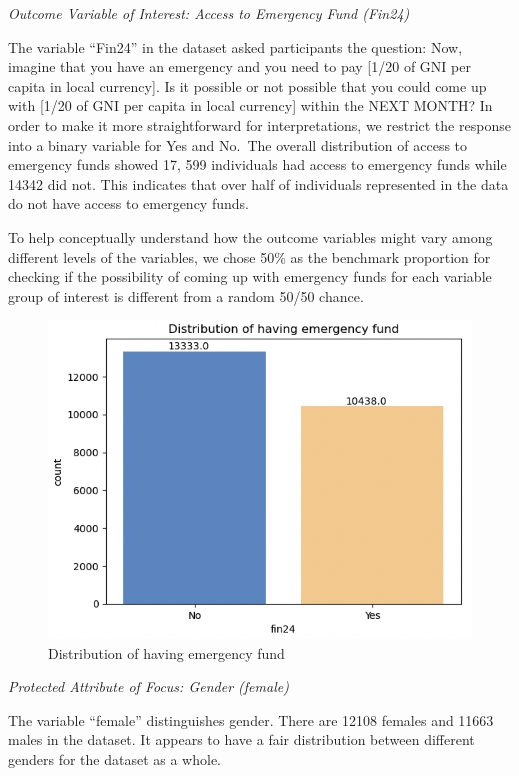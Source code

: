 \documentclass[12pt]{article}
\begin{document}
\emph{Outcome Variable of Interest: Access to Emergency Fund (Fin24)}

The variable ``Fin24'' in the dataset asked participants the question:
Now, imagine that you have an emergency and you need to pay {[}1/20 of
GNI per capita in local currency{]}. Is it possible or not possible that
you could come up with {[}1/20 of GNI per capita in local currency{]}
within the NEXT MONTH? In order to make it more straightforward for
interpretations, we restrict the response into a binary variable for Yes
and No.~The overall distribution of access to emergency funds showed 17,
599 individuals had access to emergency funds while 14342 did not. This
indicates that over half of individuals represented in the data do not
have access to emergency funds.

To help conceptually understand how the outcome variables might vary
among different levels of the variables, we chose 50\% as the benchmark
proportion for checking if the possibility of coming up with emergency
funds for each variable group of interest is different from a random
50/50 chance.

\begin{figure}

{\centering \includegraphics[width=0.7\linewidth]{graphs/f24_graph1} 

}

\caption{Distribution of having emergency fund}\label{fig:unnamed-chunk-3}
\end{figure}

\emph{Protected Attribute of Focus: Gender (female)}

The variable ``female'' distinguishes gender. There are 12108 females
and 11663 males in the dataset. It appears to have a fair distribution
between different genders for the dataset as a whole.
\end{document}
